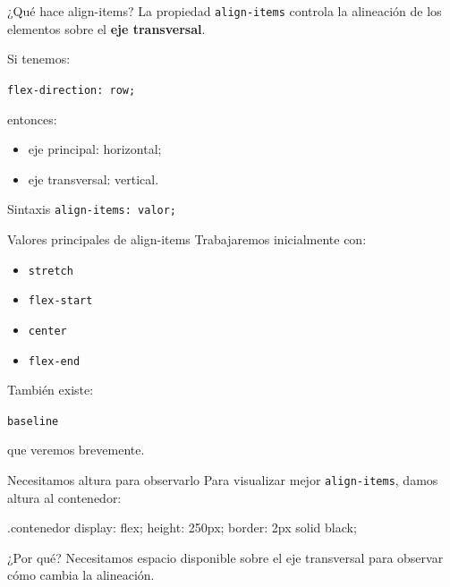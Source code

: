 \documentclass[aspectratio=169,11.5pt]{beamer}
\begin{document}
    \begin{frame}{¿Qué hace align-items?}
        La propiedad \texttt{align-items}
        controla la alineación de los elementos
        sobre el \textbf{eje transversal}.

        Si tenemos:

        \begin{center}
            \texttt{flex-direction: row;}
        \end{center}

        entonces:

        \begin{itemize}
            \item eje principal: horizontal;
            \item eje transversal: vertical.
        \end{itemize}

        \begin{block}{Sintaxis}
            \texttt{align-items: valor;}
        \end{block}
    \end{frame}

    \begin{frame}{Valores principales de align-items}
        Trabajaremos inicialmente con:

        \begin{itemize}
            \item \texttt{stretch}
            \item \texttt{flex-start}
            \item \texttt{center}
            \item \texttt{flex-end}
        \end{itemize}

        También existe:

        \begin{center}
            \texttt{baseline}
        \end{center}

        que veremos brevemente.
    \end{frame}

    \begin{frame}[fragile]{Necesitamos altura para observarlo}
        Para visualizar mejor \texttt{align-items},
        damos altura al contenedor:

        \begin{csscodedark}
            .contenedor {
                display: flex;
                height: 250px;
                border: 2px solid black;
            }
        \end{csscodedark}

        \begin{block}{¿Por qué?}
            Necesitamos espacio disponible
            sobre el eje transversal para observar
            cómo cambia la alineación.
        \end{block}
    \end{frame}
\end{document}
